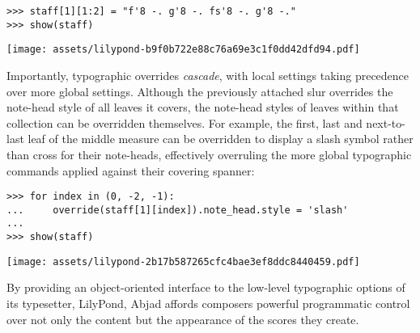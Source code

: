 \begin{comment}
<abjad>
staff[1][1:2] = "f'8 -. g'8 -. fs'8 -. g'8 -."
show(staff)
</abjad>
\end{comment}

\begin{abjadbookoutput}
\begin{singlespacing}
\vspace{-0.5\baselineskip}
\begin{verbatim}
>>> staff[1][1:2] = "f'8 -. g'8 -. fs'8 -. g'8 -."
>>> show(staff)
\end{verbatim}
\noindent\texttt{[image: assets/lilypond-b9f0b722e88c76a69e3c1f0dd42dfd94.pdf]}
\end{singlespacing}
\end{abjadbookoutput}

\noindent Importantly, typographic overrides \emph{cascade}, with local
settings taking precedence over more global settings. Although the previously
attached slur overrides the note-head style of all leaves it covers, the
note-head styles of leaves within that collection can be overridden themselves.
For example, the first, last and next-to-last leaf of the middle measure can be
overridden to display a slash symbol rather than cross for their note-heads,
effectively overruling the more global typographic commands applied against
their covering spanner:

\begin{comment}
<abjad>
for index in (0, -2, -1):
    override(staff[1][index]).note_head.style = 'slash'

show(staff)
</abjad>
\end{comment}

\begin{abjadbookoutput}
\begin{singlespacing}
\vspace{-0.5\baselineskip}
\begin{verbatim}
>>> for index in (0, -2, -1):
...     override(staff[1][index]).note_head.style = 'slash'
...
>>> show(staff)
\end{verbatim}
\noindent\texttt{[image: assets/lilypond-2b17b587265cfc4bae3ef8ddc8440459.pdf]}
\end{singlespacing}
\end{abjadbookoutput}

\noindent By providing an object-oriented interface to the low-level
typographic options of its typesetter, LilyPond, Abjad affords composers
powerful programmatic control over not only the content but the appearance of
the scores they create.


